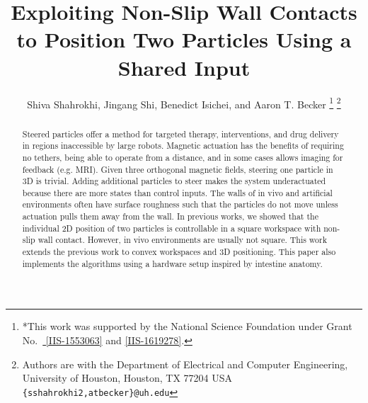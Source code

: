 \documentclass[letterpaper, 10 pt, conference]{ieeeconf}
\title{\LARGE \bf Exploiting Non-Slip Wall Contacts \\  to Position Two Particles Using a Shared Input}
\author{Shiva Shahrokhi, Jingang Shi,  Benedict Isichei, and Aaron T. Becker%
\thanks{*This work was supported by the National Science Foundation under Grant No.\ \href{http://nsf.gov/awardsearch/showAward?AWD_ID=1553063}{ [IIS-1553063]} and \href{http://nsf.gov/awardsearch/showAward?AWD_ID=1619278}{[IIS-1619278]}.}%
\thanks{Authors are with the Department of Electrical and Computer Engineering,  University of Houston, Houston, TX 77204 USA        {\tt\small  \{sshahrokhi2,atbecker\}@uh.edu}}%
}
\begin{document}
\maketitle
\thispagestyle{empty}
\pagestyle{empty}


\begin{abstract}


Steered particles offer a method for targeted therapy, interventions, and drug delivery in regions inaccessible by large robots.
Magnetic actuation has the benefits of requiring no tethers, being able to operate from a distance, and in some cases allows imaging for feedback (e.g. MRI).
Given three orthogonal magnetic fields, steering one particle in 3D is trivial. 
Adding additional particles to steer makes the system underactuated because there are more states than control inputs. 
The walls of in vivo and artificial environments often have surface roughness such that the particles do not move unless actuation pulls them away from the wall.
In previous works, we showed that the individual 2D position of two particles is controllable in a square workspace with non-slip wall contact. 
However, in vivo environments are usually not square. 
This work extends the previous work to convex workspaces and 3D positioning. 
This paper also implements the algorithms using a hardware setup inspired by intestine anatomy.





\end{abstract}
\end{document}
